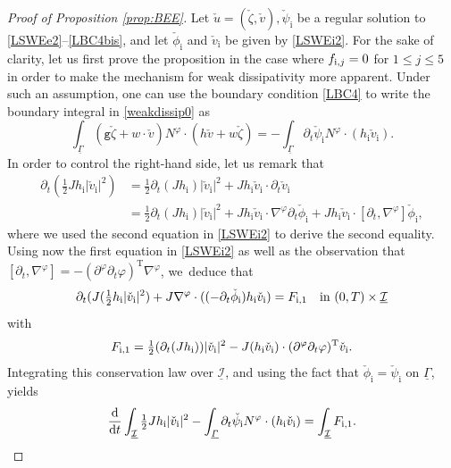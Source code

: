 \documentclass[JEP,XML,SOM,Unicode,NoFloatCountersInSection,published]{cedram}
\newcommand{\abs}[1]{\vert#1\vert}
\newcommand{\gr}{{\mathtt g}}
\newcommand{\dt}{\partial_t}
\newcommand{\cI}{{\mathcal I}}
\newcommand{\ul}[1]{\underline{#1}}
\newcommand{\itGamma}{\mathit{\Gamma}}
\theoremstyle{definition}
\begin{document}
\begin{proof}[Proof of Proposition \ref{prop:BEE}]
Let $\check{u}=(\check{\zeta},\check{v}), \check{\psi}_\mathrm{i}$ be a regular solution to \eqref{LSWEe2}--\eqref{LBC4bis},
and let $\check{\phi}_\mathrm{i}$ and $\check{v}_\mathrm{i}$ be given by \eqref{LSWEi2}.
For the sake of clarity, let us first prove the proposition in the case where $f_{{\rm i},j}=0$ for $1\leq j\leq 5$
in order to make the mechanism for weak dissipativity more apparent.
Under such an assumption, one can use the boundary condition \eqref{LBC4} to write the boundary integral in \eqref{weakdissip0} as
\begin{equation}\label{weakdissip1}
\int_{\ul{\itGamma}} (\gr \check{\zeta}+w\cdot\check{v})N^\varphi\cdot (h \check{v}+w\check{\zeta})
= -\int_{\ul{\itGamma}} \dt \check{\psi}_\mathrm{i} N^\varphi\cdot (h_\mathrm{i}\check{v}_\mathrm{i}).
\end{equation}
In order to control the right-hand side, let us remark that
\begin{align*}
\dt (\tfrac{1}{2}Jh_\mathrm{i}\abs{\check{v}_\mathrm{i}}^2)
&= \tfrac{1}{2}\dt(J h_\mathrm{i}) \abs{\check{v}_\mathrm{i}}^2+J h_\mathrm{i}\check{v}_\mathrm{i}\cdot \dt \check{v}_\mathrm{i} \\
&= \tfrac{1}{2}\dt(J h_\mathrm{i}) \abs{\check{v}_\mathrm{i}}^2+J h_\mathrm{i}\check{v}_\mathrm{i}\cdot \nabla^\varphi \dt \check{\phi}_\mathrm{i}
+ J h_\mathrm{i}\check{v}_\mathrm{i}\cdot [\dt,\nabla^\varphi] \check{\phi}_\mathrm{i},
\end{align*}
where we used the second equation in \eqref{LSWEi2} to derive the second equality.
Using now the first equation in \eqref{LSWEi2} as well as the observation that $[\dt,\nabla^\varphi]=-(\partial^\varphi\dt\varphi)^\mathrm{T}\nabla^\varphi$, we~deduce that
\begin{equation}\label{weakdissip2}
\dt(J(\tfrac12h_\mathrm{i}|\check{v}_\mathrm{i}|^2)
+ J\nabla^\varphi\cdot((-\dt\check{\phi}_\mathrm{i})h_\mathrm{i}\check{v}_\mathrm{i}) = F_{{\rm i},1} \quad\text{in } (0,T)\times\ul{\cI}
\end{equation}
with
\[
F_{{\rm i},1} = \tfrac12(\dt(Jh_\mathrm{i}))|\check{v}_\mathrm{i}|^2 - J(h_\mathrm{i}\check{v}_\mathrm{i})\cdot (\partial^\varphi\dt\varphi)^\mathrm{T}\check{v}_\mathrm{i}.
\]
Integrating this conservation law over $\ul{\cI}$, and using the fact that $\check{\phi}_\mathrm{i}=\check{\psi}_\mathrm{i}$ on $\ul{\itGamma}$, yields
\[
\frac{{\rm d}}{{\rm d}t} \int_{\ul{\cI}} \tfrac12 J h_\mathrm{i}\abs{\check{v}_\mathrm{i}}^2
- \int_{\ul{\itGamma}} \dt \check{\psi}_\mathrm{i} N^\varphi\cdot (h_\mathrm{i}\check{v}_\mathrm{i}) = \int_{\ul\cI}F_\mathrm{i,1}.
\]
\end{proof}
\end{document}
